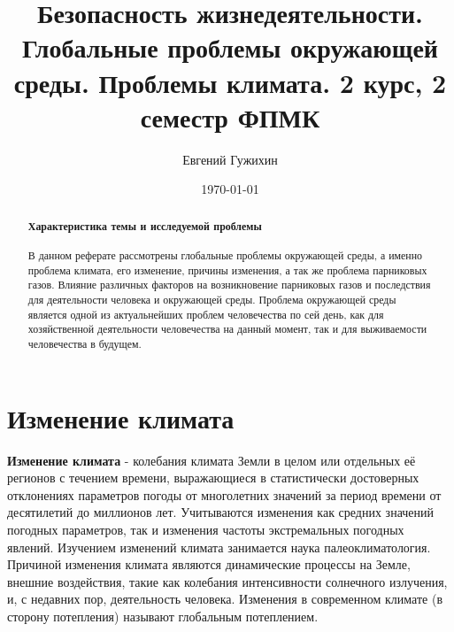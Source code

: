 \documentclass[a5paper,10pt]{article}
\author{Евгений Гужихин}
\title{Безопасность жизнедеятельности. Глобальные проблемы окружающей среды. Проблемы климата. 2 курс, 2 семестр ФПМК}
\date{\today}
\begin{document}
	\maketitle
	\newpage

	\begin{abstract}
		\item \paragraph{Характеристика темы и исследуемой проблемы}
			В данном реферате рассмотрены глобальные проблемы окружающей среды, а именно проблема климата, его изменение, причины изменения, а так же проблема парниковых газов. Влияние различных факторов на возникновение парниковых газов и последствия для деятельности человека и окружающей среды. Проблема окружающей среды является одной из актуальнейших проблем человечества по сей день, как для хозяйственной деятельности человечества на данный момент, так и для выживаемости человечества в будущем.
	\end{abstract}

	\newpage
	\tableofcontents{}
	\newpage

	\section{Изменение климата}
		\textbf{Изменение климата} - колебания климата Земли в целом или отдельных её регионов с течением времени, выражающиеся в статистически достоверных отклонениях параметров погоды от многолетних значений за период времени от десятилетий до миллионов лет. Учитываются изменения как средних значений погодных параметров, так и изменения частоты экстремальных погодных явлений. Изучением изменений климата занимается наука палеоклиматология. Причиной изменения климата являются динамические процессы на Земле, внешние воздействия, такие как колебания интенсивности солнечного излучения, и, с недавних пор, деятельность человека. Изменения в современном климате (в сторону потепления) называют глобальным потеплением.\cite{wiki}
 		
\end{document}
